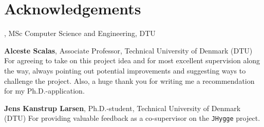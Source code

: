 \section*{Acknowledgements}
\textbf{\thesisauthor}, MSc Computer Science and Engineering, DTU \newline

\textbf{Alceste Scalas}, Associate Professor, Technical University of Denmark (DTU) \newline
For agreeing to take on this project idea and for most excellent supervision along the way, always
pointing out potential improvements and suggesting ways to challenge the project.
Also, a huge thank you for writing me a recommendation for my Ph.D.-application.

\textbf{Jens Kanstrup Larsen}, Ph.D.-student, Technical University of Denmark (DTU) \newline
For providing valuable feedback as a co-supervisor on the \texttt{JHygge} project.

